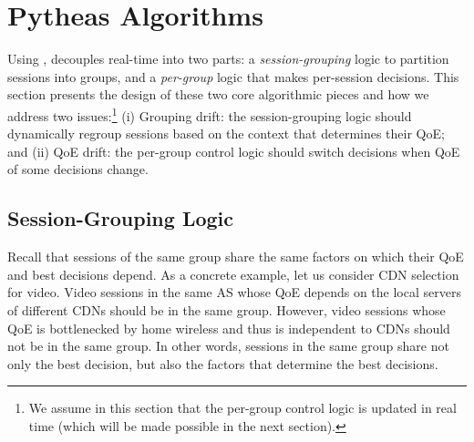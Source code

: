 \section{Pytheas Algorithms}
\label{sec:pytheas:algo}


Using \idea, \name decouples real-time \mab into two parts:
a {\em session-grouping} logic to partition sessions into groups, and a {\em per-group \mab} logic
that makes per-session decisions. This section presents the design of these two core 
algorithmic pieces and how we address two issues:\footnote{We assume in this section that the per-group control logic is updated in real time (which will be made possible in the next section).} 
(i) Grouping drift: the session-grouping logic should dynamically regroup sessions based on the context that determines their QoE; 
and (ii) QoE drift: the per-group control logic should switch decisions when QoE of some decisions change. 



\subsection{Session-Grouping Logic}
\label{subsec:grouping}

Recall that sessions of the same group share the same factors on which their
QoE and best decisions depend.  As a concrete example, let us consider  CDN
selection for video.  Video sessions in the same AS whose QoE depends on the
local servers of different CDNs should be in the same group. However, video
sessions whose QoE is bottlenecked by home wireless and thus is independent to
CDNs should not be in the same group.  In other words, sessions in the
same group share not only the best decision, but also the factors that
determine the best decisions.

